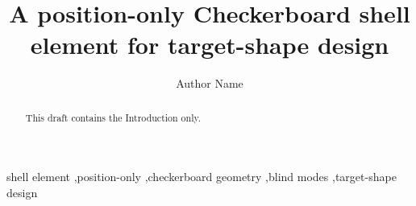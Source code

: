 \documentclass[review,12pt]{elsarticle}
\begin{document}
\begin{frontmatter}

\title{A position-only Checkerboard shell element for target-shape design}

\author{Author Name}
\address{Institution, City, Country}

\begin{abstract}
This draft contains the Introduction only.
\end{abstract}

\begin{keyword}
shell element \sep position-only \sep checkerboard geometry \sep blind modes \sep target-shape design
\end{keyword}

\end{frontmatter}





\end{document}

